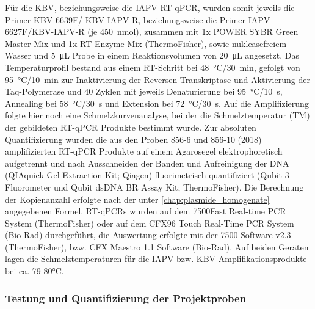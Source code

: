 Für die KBV, beziehungsweise die IAPV RT-qPCR, wurden somit jeweils die Primer KBV 6639F/ KBV-IAPV-R, beziehungsweise die Primer IAPV 6627F/KBV-IAPV-R (je \SI{450}{\nano\mol}), zusammen mit 1x POWER SYBR Green Master Mix und 1x RT Enzyme Mix (ThermoFisher), sowie nukleasefreiem Wasser und \SI{5}{\micro\liter} Probe in einem Reaktionsvolumen von \SI{20}{\micro\liter} angesetzt. Das Temperaturprofil bestand aus einem RT-Schritt bei \SI{48}{\degreeCelsius}/\SI{30}{\minute}, gefolgt von \SI{95}{\degreeCelsius}/\SI{10}{\minute} zur Inaktivierung der Reversen Transkriptase und Aktivierung der Taq-Polymerase und 40 Zyklen mit jeweils Denaturierung bei \SI{95}{\degreeCelsius}/\SI{10}{\second}, Annealing bei \SI{58}{\degreeCelsius}/\SI{30}{\second} und Extension bei \SI{72}{\degreeCelsius}/\SI{30}{\second}. Auf die Amplifizierung folgte hier noch eine Schmelzkurvenanalyse, bei der die Schmelztemperatur (TM) der gebildeten RT-qPCR Produkte bestimmt wurde. Zur absoluten Quantifizierung wurden die aus den Proben 856-6 und 856-10 (2018) amplifizierten RT-qPCR Produkte auf einem Agarosegel elektrophoretisch aufgetrennt und nach Ausschneiden der Banden und Aufreinigung der DNA (QIAquick Gel Extraction Kit; Qiagen) fluorimetrisch quantifiziert (Qubit 3 Fluorometer und Qubit dsDNA BR Assay Kit; ThermoFisher). Die Berechnung der Kopienanzahl erfolgte nach der unter \cref{chap:plasmide_homogenate} angegebenen Formel. RT-qPCRs wurden auf dem 7500Fast Real-time PCR System (ThermoFisher) oder auf dem CFX96 Touch Real-Time PCR System (Bio-Rad) durchgeführt, die Auswertung erfolgte mit der 7500 Software v2.3 (ThermoFisher), bzw. CFX Maestro 1.1 Software (Bio-Rad). Auf beiden Geräten lagen die Schmelztemperaturen für die IAPV bzw. KBV Amplifikationsprodukte bei ca. 79-80\si{\degreeCelsius}.


\subsubsection{Testung und Quantifizierung der Projektproben} 
\label{chap:quantifizierung}

